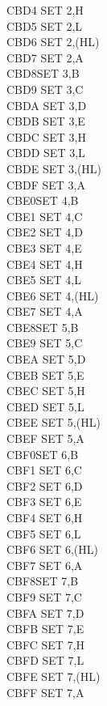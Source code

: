 \documentclass[12pt,twoside,openright,a4paper]{book}
\begin{document}
\begin{multicols}{3}
{\begin{tabbing}
	CBD4\> 	SET 2,H\\
	CBD5\> 	SET 2,L\\
	CBD6\> 	SET 2,(HL)\\
	CBD7\> 	SET 2,A\\
	CBD8\>SET 3,B\\
	CBD9\> 	SET 3,C\\
	CBDA\> 	SET 3,D\\
	CBDB\> 	SET 3,E\\
	CBDC\> 	SET 3,H\\
	CBDD\> 	SET 3,L\\
	CBDE\> 	SET 3,(HL)\\
	CBDF\> 	SET 3,A\\
	CBE0\>SET 4,B\\
	CBE1\> 	SET 4,C\\
	CBE2\> 	SET 4,D\\
	CBE3\> 	SET 4,E\\
	CBE4\> 	SET 4,H\\
	CBE5\> 	SET 4,L\\
	CBE6\> 	SET 4,(HL)\\
	CBE7\> 	SET 4,A\\
	CBE8\>SET 5,B\\
	CBE9\> 	SET 5,C\\
	CBEA\> 	SET 5,D\\
	CBEB\> 	SET 5,E\\
	CBEC\> 	SET 5,H\\
	CBED\> 	SET 5,L\\
	CBEE\> 	SET 5,(HL)\\
	CBEF\> 	SET 5,A\\
	CBF0\>SET 6,B\\
	CBF1\> 	SET 6,C\\
	CBF2\> 	SET 6,D\\
	CBF3\> 	SET 6,E\\
	CBF4\> 	SET 6,H\\
	CBF5\> 	SET 6,L\\
	CBF6\> 	SET 6,(HL)\\
	CBF7\> 	SET 6,A\\
	CBF8\>SET 7,B\\
	CBF9\> 	SET 7,C\\
	CBFA\> 	SET 7,D\\
	CBFB\> 	SET 7,E\\
	CBFC\> 	SET 7,H\\
	CBFD\> 	SET 7,L\\
	CBFE\> 	SET 7,(HL)\\
	CBFF\> 	SET 7,A\\

\end{tabbing}}
\end{multicols}
\end{document}
